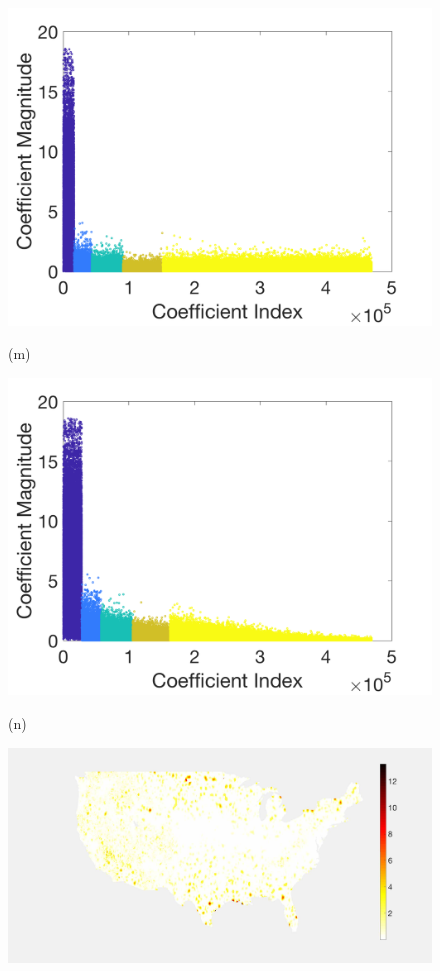 \documentclass[journal, 10pt]{IEEEtran}
\begin{document}
\begin{figure}[tb]
\begin{minipage}[m]{0.24\linewidth}
\centerline{\includegraphics[width=.9\linewidth]{fig_temp_analysis_coeffs}}
\centerline{\small{(m)}}
\end{minipage}
\begin{minipage}[m]{0.24\linewidth}
\centerline{\includegraphics[width=.9\linewidth]{fig_temp_analysis_coeffs_adapted}}
\centerline{\small{(n)}}
\end{minipage}
\begin{minipage}[m]{0.24\linewidth}
\centerline{\includegraphics[width=.85\linewidth]{fig_temp_error}}

\end{minipage}
\end{figure}
\end{document}
